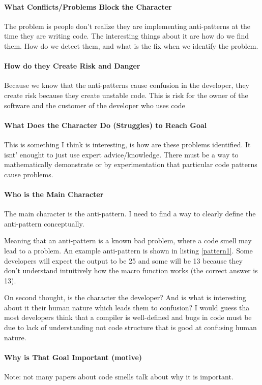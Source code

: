 \documentclass[conference]{IEEEtran}
\begin{document}
\paragraph{What Conflicts/Problems Block the Character}

The problem is people don't realize they are implementing anti-patterns at the time they are writing code.
The interesting things about it are how do we find them. 
How do we detect them, and what is the fix when we identify the problem.

\paragraph{How do they Create Risk and Danger}
Because we know that the anti-patterns cause confusion in the developer, they create risk because they create unstable code. 
This is risk for the owner of the software and the customer of the developer who uses code
\paragraph{What Does the Character Do (Struggles) to Reach Goal}
This is something I think is interesting, is how are these problems identified.
It isnt' enought to just use expert advice/knowledge. 
There must be a way to mathematically demonstrate or by experimentation that particular code patterns cause problems.

\paragraph{Who is the Main Character}
The main character is the anti-pattern. I need to find a way to clearly define the anti-pattern conceptually. 

Meaning that an anti-pattern is a known bad problem, where a code smell may lead to a problem.
An example anti-pattern is shown in listing \ref{pattern1}. Some developers will expect the output to be 25 and some will be 13 because they don't understand intuitively how the macro function works (the correct answer is 13).

On second thought, is the character the developer? 
And is what is interesting about it their human nature which leads them to confusion?
I would guess tha most developers think that a compiler is well-defined and bugs in code must be due to lack of understanding not code structure that is good at confusing human nature.

\paragraph{Why is That Goal Important (motive)}
Note: not many papers about code smells talk about why it is important.
\end{document}
